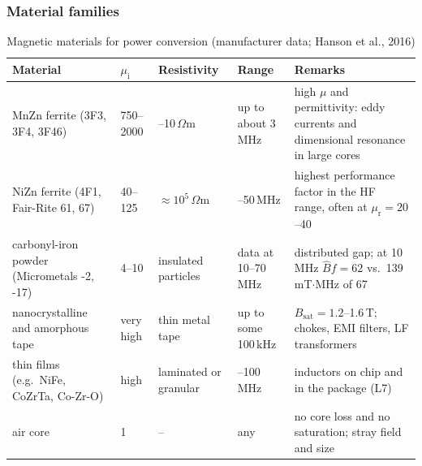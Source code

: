 \begin{frame}
	\frametitle{Material families}
	\begin{table}
		\centering
		\footnotesize
		\begin{tabular}{|>{\raggedright\arraybackslash}p{3.3cm}|l|>{\raggedright\arraybackslash}p{2.0cm}|>{\raggedright\arraybackslash}p{2.1cm}|>{\raggedright\arraybackslash}p{4.6cm}|}
			\hline
			\textbf{Material}                                & $\mu_\mathrm{i}$ & \textbf{Resistivity}        & \textbf{Range}            & \textbf{Remarks}                                                         \\
			\hline
			MnZn ferrite (3F3, 3F4, 3F46)                    & 750--2000        & 2--10\,$\Omega$m            & up to about 3\,MHz        & high $\mu$ and permittivity: eddy currents and dimensional resonance in large cores \\
			NiZn ferrite (4F1, Fair-Rite 61, 67)             & 40--125          & $\approx10^5\,\Omega$m      & 2--50\,MHz                & highest performance factor in the HF range, often at $\mu_\mathrm{r}=20$--40 \\
			carbonyl-iron powder (Micrometals -2, -17)       & 4--10            & insulated particles         & data at 10--70\,MHz       & distributed gap; at 10\,MHz $\hat{B}f=62$ vs.\ 139\,mT$\cdot$MHz of 67 \\
			nanocrystalline and amorphous tape               & very high        & thin metal tape             & up to some 100\,kHz       & $B_\mathrm{sat}=1.2$--1.6\,T; chokes, EMI filters, LF transformers \\
			thin films (e.g.\ NiFe, CoZrTa, Co-Zr-O)          & high             & laminated or granular       & 5--100\,MHz               & inductors on chip and in the package (L7)                               \\
			air core                                         & 1                & --                          & any                       & no core loss and no saturation; stray field and size                    \\
			\hline
		\end{tabular}
		\caption{Magnetic materials for power conversion (manufacturer data; Hanson et al., 2016)}
	\end{table}
\end{frame}


